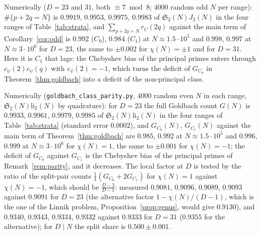 \documentclass[11pt]{amsart}
\theoremstyle{remark}
\newcommand{\sS}{\mathfrak S}
\begin{document}
Numerically ($D=23$ and $31$, both $\equiv7\bmod8$; $4000$ random odd $N$ per range): $\#\{p+2q=N\}$ is $0.9919$, $0.9953$, $0.9975$, $0.9983$ of $\sS_2(N)J_2(N)$ in the four ranges of Table~\ref{tab:strata}, and $\sum_{p+2q=N}r_C(2q)$ against the main term of Corollary~\ref{cor:odd} is $0.992$ ($C_0$), $0.984$ ($C_1$) at $N\approx1.5\cdot10^5$ and $0.998$, $0.997$ at $N\approx3\cdot10^6$ for $D=23$, the same to $\pm0.002$ for $\chi(N)=\pm1$ and for $D=31$. Here it is $C_1$ that lags: the Chebyshev bias of the principal primes enters through $c_\psi(2)c_\psi(q)$ with $c_\psi(2)=-1$, which turns the deficit of $G_{C_0}$ in Theorem~\ref{thm:goldbach} into a deficit of the non-principal class.

Numerically (\texttt{goldbach\_class\_parity.py}, $4000$ random even $N$ in each range, $\sS_2(N)\mathrm{li}_2(N)$ by quadrature): for $D=23$ the full Goldbach count $G(N)$ is $0.9933$, $0.9961$, $0.9979$, $0.9985$ of $\sS_2(N)\mathrm{li}_2(N)$ in the four ranges of Table~\ref{tab:strata} (standard error $0.0002$), and $G_{C_0}(N)$, $G_{C_1}(N)$ against the main term of Theorem~\ref{thm:goldbach} are $0.985$, $0.992$ at $N\approx1.5\cdot10^5$ and $0.996$, $0.999$ at $N\approx3\cdot10^6$ for $\chi(N)=1$, the same to $\pm0.001$ for $\chi(N)=-1$; the deficit of $G_{C_0}$ against $G_{C_1}$ is the Chebyshev bias of the principal primes of Remark~\ref{rem:parity}, and it decreases. The local factor at $D$ is tested by the ratio of the split-pair counts $\frac14(G_{C_0}+2G_{C_1})$ for $\chi(N)=1$ against $\chi(N)=-1$, which should be $\frac{D-3}{D-1}$: measured $0.9081$, $0.9096$, $0.9089$, $0.9093$ against $0.9091$ for $D=23$ (the alternative factor $1-\chi(N)/(D-1)$, which is the one of the Linnik problem, Proposition~\ref{prop:genus}, would give $0.9130$), and $0.9340$, $0.9343$, $0.9334$, $0.9332$ against $0.9333$ for $D=31$ ($0.9355$ for the alternative); for $D\mid N$ the split share is $0.500\pm0.001$.
\end{document}
